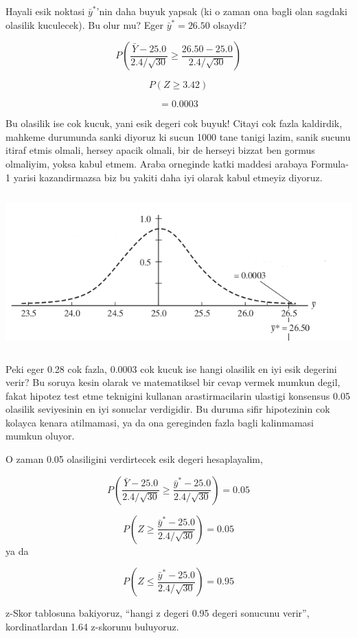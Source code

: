 \documentclass[12pt,fleqn]{article}\usepackage{../common}
\begin{document}
Hayali esik noktasi $\bar{y}^*$'nin daha buyuk yapsak (ki o zaman ona bagli
olan sagdaki olasilik kuculecek). Bu olur mu? Eger $\bar{y}^* = 26.50$
olsaydi? 

$$ P(\frac{\bar{Y} - 25.0}{2.4 / \sqrt{30}} \ge 
\frac{26.50 - 25.0}{2.4 / \sqrt{30}}) 
$$

$$ P(Z \ge 3.42) $$

$$ = 0.0003 $$

Bu olasilik ise cok kucuk, yani esik degeri cok buyuk! Citayi cok fazla
kaldirdik, mahkeme durumunda sanki diyoruz ki sucun 1000 tane tanigi lazim,
sanik sucunu itiraf etmis olmali, hersey apacik olmali, bir de herseyi
bizzat ben gormus olmaliyim, yoksa kabul etmem. Araba orneginde katki
maddesi arabaya Formula-1 yarisi kazandirmazsa biz bu yakiti daha iyi
olarak kabul etmeyiz diyoruz.

\includegraphics[height=6cm]{carhyp2.png}

Peki eger 0.28 cok fazla, 0.0003 cok kucuk ise hangi olasilik en iyi esik
degerini verir? Bu soruya kesin olarak ve matematiksel bir cevap vermek
mumkun degil, fakat hipotez test etme teknigini kullanan arastirmacilarin
ulastigi konsensus 0.05 olasilik seviyesinin en iyi sonuclar verdigidir. Bu
duruma sifir hipotezinin cok kolayca kenara atilmamasi, ya da ona
gereginden fazla bagli kalinmamasi mumkun oluyor.

O zaman 0.05 olasiligini verdirtecek esik degeri hesaplayalim,

$$ P(\frac{\bar{Y} - 25.0}{2.4 / \sqrt{30}} \ge 
\frac{\bar{y}^* - 25.0}{2.4 / \sqrt{30}}) = 0.05
$$

$$ P(Z \ge  \frac{\bar{y}^* - 25.0}{2.4 / \sqrt{30}}) = 0.05
$$
ya da

$$ P(Z \le  \frac{\bar{y}^* - 25.0}{2.4 / \sqrt{30}}) = 0.95 $$

z-Skor tablosuna bakiyoruz, ``hangi z degeri 0.95 degeri sonucunu verir'',
kordinatlardan 1.64 z-skorunu buluyoruz. 
\end{document}
